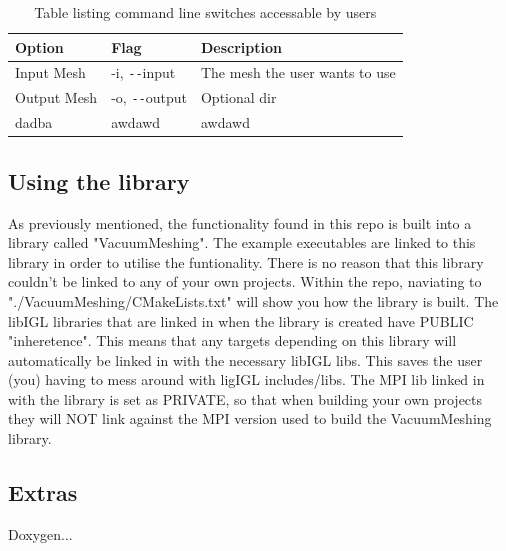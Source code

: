 \documentclass[12pt, letterpaper]{article}
\begin{document}
\begin{table}[ht]
\begin{center}
\begin{tabularx}{0.9\textwidth}{
  | >{\raggedright\arraybackslash}X 
  | >{\raggedright\arraybackslash}X 
  | >{\raggedright\arraybackslash}X | }
  \hline
  \textbf{Option} & \textbf{Flag} & \textbf{Description} \\
  \hline
  \hline
  Input Mesh & -i, \texttt{-{}-}input & The mesh the user wants to use\\
  \hline
  Output Mesh & -o, \texttt{-{}-}output & Optional dir\\
  \hline 
  dadba & awdawd & awdawd \\
  \hline
\end{tabularx}
\caption{Table listing command line switches accessable by users}
\label{CLFlagsTab}
\end{center}
\end{table}


\subsection{Using the library}
As previously mentioned, the functionality found in this repo is built into a library called "VacuumMeshing". The example executables are linked to this library in order to utilise the funtionality. There is no reason that this library couldn't be linked to any of your own projects. Within the repo, naviating to "./VacuumMeshing/CMakeLists.txt" will show you how the library is built. The libIGL libraries that are linked in when the library is created have PUBLIC "inheretence". This means that any targets depending on this library will automatically be linked in with the necessary libIGL libs. This saves the user (you) having to mess around with ligIGL includes/libs. The MPI lib linked in with the library is set as PRIVATE, so that when building your own projects they will NOT link against the MPI version used to build the VacuumMeshing library.

\subsection{Extras}
Doxygen...
\end{document}
